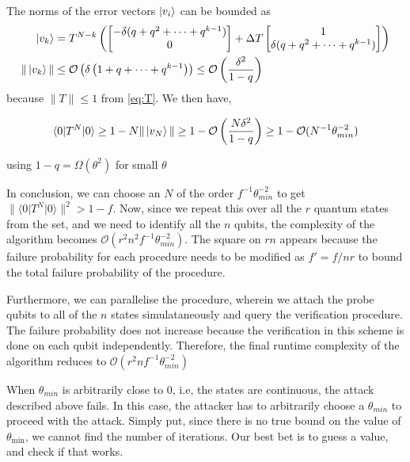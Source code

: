 \documentclass[]{article}
\newcommand{\Exp}[3]{\langle #1 \vert #2 \vert #3 \rangle}
\begin{document}
\begin{enumerate}
    The norms of the error vectors $\ket{v_i}$ can be bounded as 
    \begin{align*}
        \ket{v_k} &= T^{N - k}  \left(\begin{bmatrix}
            -\delta (q + q^2 + \cdots + q^{k - 1}) \\ 0  
        \end{bmatrix} + \Delta T  \begin{bmatrix}
            1 \\ \delta (q + q^2 + \cdots + q^{k - 1})  
        \end{bmatrix} \right) \\
        \| \ket{v_k} \| &\leq \mathcal O \left(\delta\left(1 + q + \dots + q^{k - 1}\right)\right) \leq \mathcal O \left(\frac{\delta^2}{1 - q}\right)
    \end{align*}
    because $\|T \| \leq 1$ from \ref{eq:T}. We then have,

    \begin{align}
        \Exp{0}{T^N}{0} \geq 1 - N \| \ket{v_N}\| \geq 1 - \mathcal O\left(\frac{N \delta^2}{1 - q}\right) \geq 1 - \mathcal O(N^{-1} \theta^{-2}_{min})
    \end{align}

    using $1 - q = \Omega(\theta^2)$ for small $\theta$ 

    In conclusion, we can choose an $N$ of the order $f^{-1}\theta_{min}^{-2}$ to get $\|\Exp{0}{T^N}{0} \|^2 > 1 - f$. Now, since we repeat this over all the $r$ quantum states from the set, and we need to identify all the $n$ qubits, the complexity of the algorithm becomes $\mathcal O(r^2 n^2f^{-1} \theta_{min}^{-2})$. The square on $rn$ appears because the failure probability for each procedure needs to be modified as $f' = f/nr$ to bound the total failure probability of the procedure.

    Furthermore, we can parallelise the procedure, wherein we attach the probe qubits to all of the $n$ states simulataneously and query the verification procedure. The failure probability does not increase because the verification in this scheme is done on each qubit independently. Therefore, the final runtime complexity of the algorithm reduces to $\mathcal O(r^2 nf^{-1} \theta_{min}^{-2})$
\end{enumerate}

When $\theta_{min}$ is arbitrarily close to $0$, i.e, the states are continuous, the attack described above fails. In this case, the attacker has to arbitrarily choose a $\theta_{min}$ to proceed with the attack. Simply put, since there is no true bound on the value of $\theta_{\min}$, we cannot find the number of iterations. Our best bet is to guess a value, and check if that works.
\end{document}
